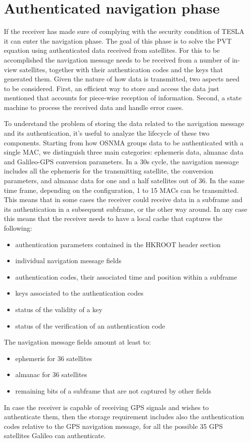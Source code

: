 \section{Authenticated navigation phase}
If the receiver has made sure of complying with the security condition of TESLA
it can enter the navigation phase. The goal of this phase is to solve the PVT
equation using authenticated data received from satellites. For this to be
accomplished the navigation message needs to be received from a number of
in-view satellites, together with their authentication codes and the keys that
generated them. Given the nature of how data is transmitted, two aspects need to
be considered. First, an efficient way to store and access the data just
mentioned that accounts for piece-wise reception of information. Second, a state
machine to process the received data and handle error cases.

\vspace{\baselineskip}

To understand the problem of storing the data related to the navigation message
and its authentication, it's useful to analyze the lifecycle of these two
components. Starting from how OSNMA groups data to be authenticated with a
single MAC, we distinguish three main categories: ephemeris data, almanac data
and Galileo-GPS conversion parameters. In a 30s cycle, the navigation message
includes all the ephemeris for the transmitting satellite, the conversion
parameters, and almanac data for one and a half satellites out of 36. In the
same time frame, depending on the configuration, 1 to 15 MACs can be
transmitted.  This means that in some cases the receiver could receive data in a
subframe and its authentication in a subsequent subframe, or the other way
around. In any case this means that the receiver needs to have a local cache
that captures the following:
\begin{itemize}
  \item authentication parameters contained in the HKROOT header section
  \item individual navigation message fields
  \item authentication codes, their associated time and position within a
    subframe
  \item keys associated to the authentication codes
  \item status of the validity of a key
  \item status of the verification of an authentication code
\end{itemize}
The navigation message fields amount at least to:
\begin{itemize}
  \item ephemeris for 36 satellites
  \item almanac for 36 satellites
  \item remaining bits of a subframe that are not captured by other fields
\end{itemize}
In case the receiver is capable of receiving GPS signals and wishes to
authenticate them, then the storage requirement includes also the authentication
codes relative to the GPS navigation message, for all the possible 35 GPS
satellites Galileo can authenticate.


